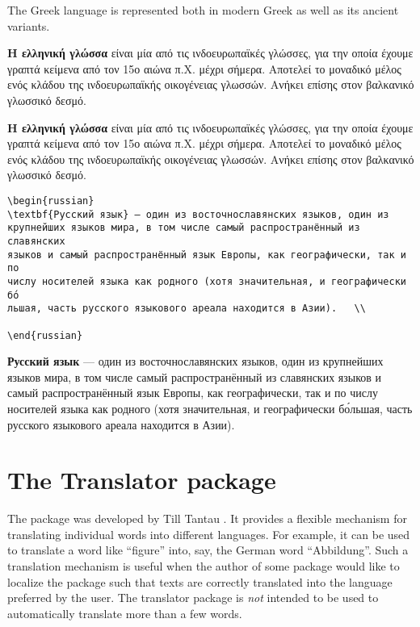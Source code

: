 The Greek language is represented both in modern Greek as well as its ancient variants.

\begin{phdverbatim}
\begin{greek}
\textbf{Η ελληνική γλώσσα} είναι μία από τις ινδοευρωπαϊκές γλώσσες, για την
οποία έχουμε γραπτά κείμενα από τον 15ο αιώνα π.Χ. μέχρι σήμερα. Αποτελεί το
μοναδικό μέλος ενός κλάδου της ινδοευρωπαϊκής οικογένειας γλωσσών. Ανήκει
επίσης στον βαλκανικό γλωσσικό δεσμό.\\	
\end{greek}
\end{phdverbatim}

\topline

\textbf{Η ελληνική γλώσσα} είναι μία από τις ινδοευρωπαϊκές γλώσσες, για την
οποία έχουμε γραπτά κείμενα από τον 15ο αιώνα π.Χ. μέχρι σήμερα. Αποτελεί το
μοναδικό μέλος ενός κλάδου της ινδοευρωπαϊκής οικογένειας γλωσσών. Ανήκει
επίσης στον βαλκανικό γλωσσικό δεσμό.\\	

\bottomline

\begin{verbatim}
\begin{russian}
\textbf{Русский язык} — один из восточнославянских языков, один из 
крупнейших языков мира, в том числе самый распространённый из славянских
языков и самый распространённый язык Европы, как географически, так и по
числу носителей языка как родного (хотя значительная, и географически бо́
льшая, часть русского языкового ареала находится в Азии).	\\

\end{russian}
\end{verbatim}



\textbf{Русский язык} — один из восточнославянских языков, один из крупнейших языков мира, в том числе самый распространённый из славянских языков и самый распространённый язык Европы, как географически, так и по числу носителей языка как родного (хотя значительная, и географически бо́льшая, часть русского языкового ареала находится в Азии).	\\


\section{The Translator package}

The  package was developed by Till Tantau \cite{translator}. It provides a flexible
mechanism for translating individual words into different languages.
For example, it can be used to translate a word like \enquote{figure} into,
say, the German word \enquote{Abbildung}. Such a translation mechanism is
useful when the author of some package would like to localize the
package such that texts are correctly translated into the language
preferred by the user. The translator package is \emph{not} intended
to be used to automatically translate more than a few words. 

